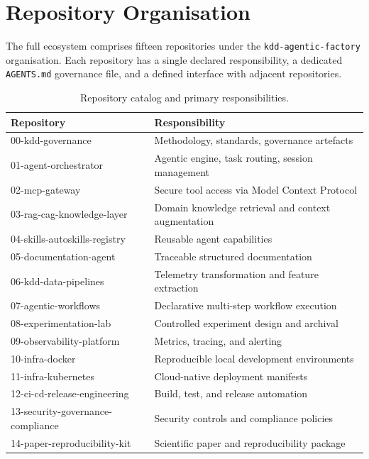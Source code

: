 \section{Repository Organisation}
\label{app:repository-organization}

The full ecosystem comprises fifteen repositories under the
\texttt{kdd-agentic-factory} organisation. Each repository has a single declared
responsibility, a dedicated \texttt{AGENTS.md} governance file, and a defined
interface with adjacent repositories.

\begin{table}[ht]
\centering
\caption{Repository catalog and primary responsibilities.}
\label{tab:repository-catalog}
\begin{tabular}{lp{8cm}}
\toprule
Repository & Responsibility \\
\midrule
00-kdd-governance & Methodology, standards, governance artefacts \\
01-agent-orchestrator & Agentic engine, task routing, session management \\
02-mcp-gateway & Secure tool access via Model Context Protocol \\
03-rag-cag-knowledge-layer & Domain knowledge retrieval and context augmentation \\
04-skills-autoskills-registry & Reusable agent capabilities \\
05-documentation-agent & Traceable structured documentation \\
06-kdd-data-pipelines & Telemetry transformation and feature extraction \\
07-agentic-workflows & Declarative multi-step workflow execution \\
08-experimentation-lab & Controlled experiment design and archival \\
09-observability-platform & Metrics, tracing, and alerting \\
10-infra-docker & Reproducible local development environments \\
11-infra-kubernetes & Cloud-native deployment manifests \\
12-ci-cd-release-engineering & Build, test, and release automation \\
13-security-governance-compliance & Security controls and compliance policies \\
14-paper-reproducibility-kit & Scientific paper and reproducibility package \\
\bottomrule
\end{tabular}
\end{table}
